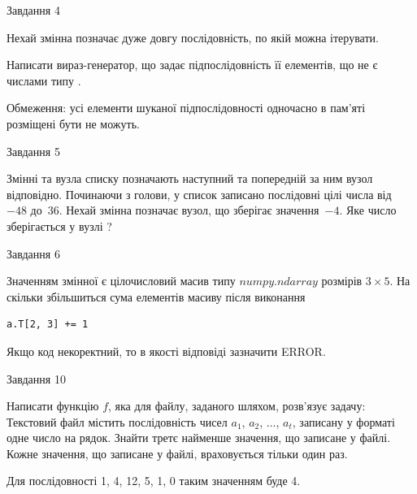 \documentclass[12pt, ukrainian]{article}
\begin{document}
{               
{\begin{center}Завдання {4}\end{center}}
\vspace{-6mm}
Нехай змінна  позначає дуже довгу послідовність, по якій можна ітерувати.

Написати вираз-генератор, що задає підпослідовність її елементів, що не є числами типу .

Обмеження: усі елементи шуканої підпослідовності одночасно в пам'яті розміщені бути не можуть.\par

\vspace{10mm}
               
{\begin{center}Завдання {5}\end{center}}
\vspace{-6mm}
Змінні  та  вузла списку позначають наступний та попередній за ним вузол відповідно. Починаючи з голови, у список записано послідовні цілі числа від~$-48$ до~$36$. Нехай змінна  позначає вузол, що зберігає значення~$-4$.
Яке число зберігається у вузлі  ?\par

               
{\begin{center}Завдання {6}\end{center}}
\vspace{-6mm}
Значенням змінної  є цілочисловий масив типу $numpy.ndarray$ розмірів $3{\times}5$. На скільки збільшиться сума елементів масиву  після виконання
\begin{verbatim}
a.T[2, 3] += 1
\end{verbatim}


Якщо код некоректний, то в якості відповіді зазначити ERROR.\par

               
{\begin{center}Завдання {10}\end{center}}
\vspace{-6mm}

Написати функцію $f$, яка для файлу, заданого шляхом, розв’язує задачу:\\ Текстовий файл містить послідовність чисел $a_1$, $a_2$, $\ldots$, $a_t$, записану у форматі одне число на рядок. Знайти третє найменше значення, що записане у файлі. Кожне значення, що записане у файлі, враховується тільки один раз. \par
Для послідовності 1, 4, 12, 5, 1, 0 таким значенням буде 4.

}
\end{document}
